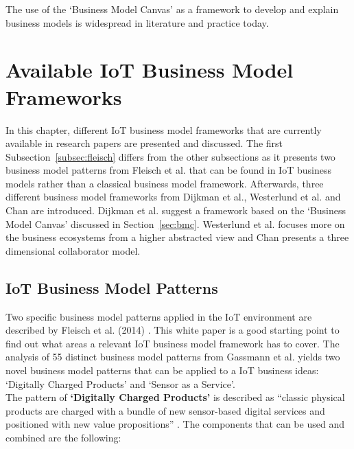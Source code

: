 		The use of the `Business Model Canvas' as a framework to develop and explain business models is widespread in literature and practice today.
\vspace{-1em}
\section{Available IoT Business Model Frameworks}
\label{sec:bmf_available}
\vspace{-1em}
	In this chapter, different IoT business model frameworks that are currently available in research papers are presented and discussed. The first Subsection~\ref{subsec:fleisch} differs from the other subsections as it presents two business model patterns from Fleisch et al. that can be found in IoT business models rather than a classical business model framework. Afterwards, three different business model frameworks from Dijkman et al., Westerlund et al. and Chan are introduced. Dijkman et al. suggest a framework based on the `Business Model Canvas' discussed in Section~\ref{sec:bmc}. Westerlund et al. focuses more on the business ecosystems from a higher abstracted view and Chan presents a three dimensional collaborator model.
	\vspace{-1em}
	\subsection{IoT Business Model Patterns}
	\vspace{-1em}
	\label{subsec:fleisch}
		Two specific business model patterns applied in the IoT environment are described by Fleisch et al. (2014) \cite{fleisch}. This white paper is a good starting point to find out what areas a relevant IoT business model framework has to cover. The analysis of 55 distinct business model patterns from Gassmann et al. \cite{gassmann55} yields two novel business model patterns that can be applied to a IoT business ideas: `Digitally Charged Products' and `Sensor as a Service'.\\
		The pattern of \textbf{`Digitally Charged Products'} is described as ``classic physical products are charged with a bundle of new sensor-based digital services and positioned with new value propositions'' \cite{fleisch}. The components that can be used and combined are the following:

